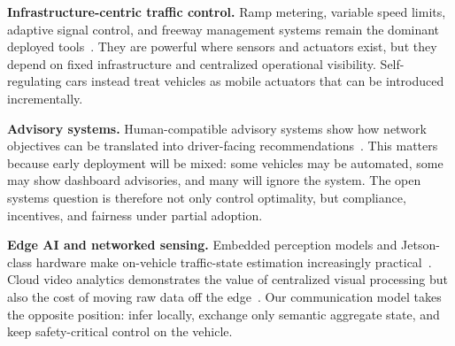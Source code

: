 \noindent\textbf{Infrastructure-centric traffic control.}
Ramp metering, variable speed limits, adaptive signal control, and freeway management systems remain the dominant deployed tools~\cite{arnold1998ramp,papageorgiou2002freeway,scats,scoot}. They are powerful where sensors and actuators exist, but they depend on fixed infrastructure and centralized operational visibility. Self-regulating cars instead treat vehicles as mobile actuators that can be introduced incrementally.

\noindent\textbf{Advisory systems.}
Human-compatible advisory systems show how network objectives can be translated into driver-facing recommendations~\cite{Yan_2023,cho2023temporal,fridman2018human}. This matters because early deployment will be mixed: some vehicles may be automated, some may show dashboard advisories, and many will ignore the system. The open systems question is therefore not only control optimality, but compliance, incentives, and fairness under partial adoption.

\noindent\textbf{Edge AI and networked sensing.}
Embedded perception models and Jetson-class hardware make on-vehicle traffic-state estimation increasingly practical~\cite{nvidia2023jetson,redmon2016yolo,yang2024depth}. Cloud video analytics demonstrates the value of centralized visual processing but also the cost of moving raw data off the edge~\cite{kang2017noscope,kang2018blazeit}. Our communication model takes the opposite position: infer locally, exchange only semantic aggregate state, and keep safety-critical control on the vehicle.
\vspace{-0.4cm}
